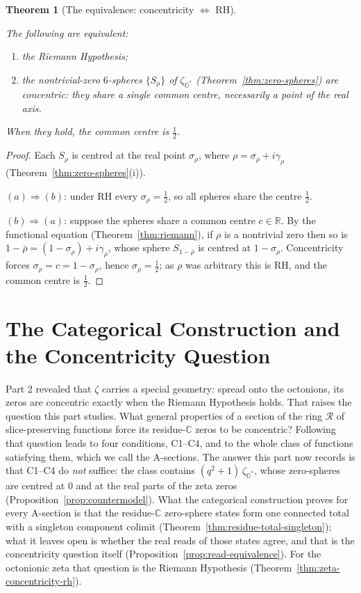 \documentclass[11pt]{article}
\newcommand{\OO}{\mathbb{O}}
\newcommand{\CC}{\mathbb{C}}
\newcommand{\RR}{\mathbb{R}}
\newcommand{\Ostar}{\OO^{*}}
\newcommand{\zetaO}{\zeta_{\Ostar}}
\providecommand{\lean}[1]{}
\providecommand{\uses}[1]{}
\theoremstyle{plain}
\newtheorem{theorem}{Theorem}[section]
\theoremstyle{definition}
\theoremstyle{remark}
\begin{document}
\begin{theorem}[The equivalence: concentricity $\Leftrightarrow$ RH]\label{thm:rh-equiv}
\lean{riemannHypothesis_iff_concentric}
\uses{thm:zero-spheres, thm:riemann}
The following are equivalent:
\begin{enumerate}[leftmargin=2.4em]
\item[(a)] the Riemann Hypothesis;
\item[(b)] the nontrivial-zero $6$-spheres $\{S_\rho\}$ of $\zetaO$
  (Theorem~\ref{thm:zero-spheres}) are \emph{concentric}: they share a single common
  centre, necessarily a point of the real axis.
\end{enumerate}
When they hold, the common centre is $\tfrac12$.
\end{theorem}
\begin{proof}
Each $S_\rho$ is centred at the real point $\sigma_\rho$, where
$\rho=\sigma_\rho+i\gamma_\rho$ (Theorem~\ref{thm:zero-spheres}(i)).

$(a)\Rightarrow(b)$: under RH every $\sigma_\rho=\tfrac12$, so all spheres share the
centre $\tfrac12$.

$(b)\Rightarrow(a)$: suppose the spheres share a common centre $c\in\RR$. By the functional
equation (Theorem~\ref{thm:riemann}), if $\rho$ is a nontrivial zero then so is
$1-\bar\rho=(1-\sigma_\rho)+i\gamma_\rho$, whose sphere $S_{1-\bar\rho}$ is centred at
$1-\sigma_\rho$. Concentricity forces $\sigma_\rho=c=1-\sigma_\rho$, hence
$\sigma_\rho=\tfrac12$; as $\rho$ was arbitrary this is RH, and the common centre is $\tfrac12$.
\end{proof}

\part{The Categorical Construction and the Concentricity Question}\label{part:stack}

Part 2 revealed that $\zeta$ carries a special geometry: spread onto the octonions, its zeros are
concentric exactly when the Riemann Hypothesis holds. That raises the question this part studies.
What general properties of a section of the ring $\mathcal R$ of slice-preserving functions force
its residue-$\CC$ zeros to be concentric? Following that question leads to four conditions,
\textup{C1--C4}, and to the whole class of functions satisfying them, which we call the A-sections.
The answer this part now records is that \textup{C1--C4} do \emph{not} suffice: the class
contains $(q^{2}+1)\,\zetaO$, whose zero-spheres are centred at $0$ and at the real parts of the
zeta zeros (Proposition~\ref{prop:countermodel}). What the categorical construction proves for
every A-section is that the residue-$\CC$ zero-sphere states form one connected total with a
singleton component colimit (Theorem~\ref{thm:residue-total-singleton}); what it leaves open is
whether the real reads of those states agree, and that is the concentricity question itself
(Proposition~\ref{prop:read-equivalence}). For the octonionic zeta that question is the Riemann
Hypothesis (Theorem~\ref{thm:zeta-concentricity-rh}).
\end{document}
